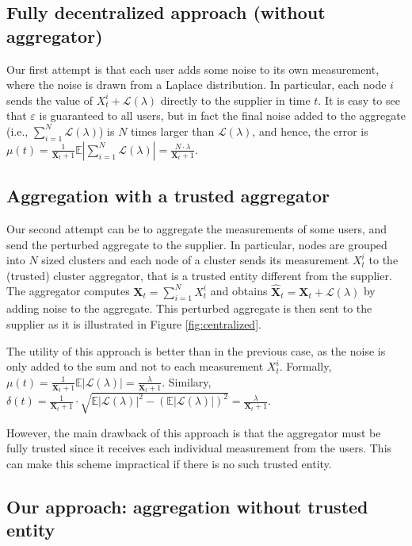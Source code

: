 \documentclass[11pt,a4paper]{article}
\theoremstyle{plain}
\theoremstyle{plain}
\theoremstyle{plain}
\theoremstyle{plain}
\theoremstyle{nonumberplain} \theoremseparator{}
\begin{document}
\subsection{Fully decentralized approach (without aggregator)}
\label{sec:trusted_appoach}
Our first attempt is that each user adds some noise to its own measurement, where the noise
is drawn from a Laplace distribution. In particular, each node $i$ sends the value of $X_{t}^{i} + \mathcal{L}(\lambda)$ directly to the supplier in time $t$.  
It is easy to see that $\varepsilon$ is guaranteed to all users, but in fact
the final noise added to the aggregate (i.e., $\sum_{i=1}^N\mathcal{L}(\lambda)$) is $N$ times larger than $\mathcal{L}(\lambda)$, and hence, the error is $\mu(t) = \frac{1}{\mathbf{X}_t + 1} \mathbb{E}|\sum_{i=1}^N \mathcal{L}(\lambda)| = \frac{N \cdot \lambda}{\mathbf{X}_t + 1}$. 

\subsection{Aggregation with a trusted aggregator}
Our second attempt can be to aggregate the measurements of some users, and send the perturbed
aggregate to the supplier. In particular, nodes are grouped into $N$ sized clusters and each node of a cluster sends its measurement $X_{t}^{i}$ to the (trusted) cluster aggregator, that is a trusted entity different from the supplier. 
The aggregator computes $\mathbf{X}_{t} = \sum_{i=1}^{N} X_{t}^{i}$  and obtains $\hat{\mathbf{X}}_{t} = \mathbf{X}_{t} + \mathcal{L}(\lambda)$ by adding noise to the aggregate. This perturbed aggregate is then sent to the supplier as it is illustrated in Figure \ref{fig:centralized}.

The utility of this approach is better than in the previous case, as the noise is only added to the sum and not to each measurement $X_{t}^{i}$. Formally, $\mu(t) = \frac{1}{\mathbf{X}_{t}+1}\mathbb{E}|\mathcal{L}(\lambda)| = \frac{\lambda}{\mathbf{X}_{t}+1}$. Similary, 
$\delta(t) = \frac{1}{\mathbf{X}_{t}+1} \cdot \sqrt{\mathbb{E}|\mathcal{L}(\lambda)|^2 - (\mathbb{E}|\mathcal{L}(\lambda)|)^2} = \frac{\lambda}{\mathbf{X}_{t}+1}$. 

However, the main drawback of this approach is that the aggregator must be 
fully trusted since it receives each individual measurement from the users.
This can make this scheme impractical if there is no such trusted entity.


\subsection{Our approach: aggregation without trusted entity}
\end{document}
